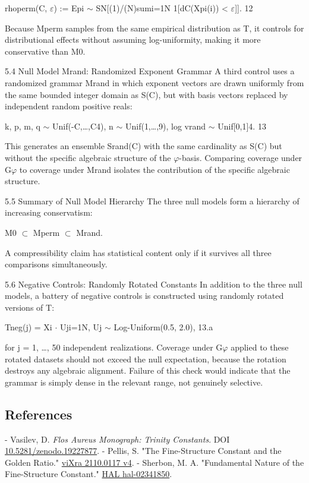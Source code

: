   rhoperm(C, $\varepsilon$) := Epi $\sim$ SN[(1)/(N)sumi=1N 1[dC(Xpi(i)) < $\varepsilon$]]. 12

  Because Mperm samples from the same empirical distribution as T, it controls for
  distributional effects without assuming log-uniformity, making it more conservative
  than M0.

  5.4 Null Model Mrand: Randomized Exponent Grammar
  A third control uses a randomized grammar Mrand in which exponent vectors are
  drawn uniformly from the same bounded integer domain as S(C), but with basis vectors
  replaced by independent random positive reals:

  k, p, m, q $\sim$ Unif({-C,…,C}4), n $\sim$ Unif({1,…,9}), log vrand $\sim$ Unif[0,1]4. 13

  This generates an ensemble Srand(C) with the same cardinality as S(C) but without the
  specific algebraic structure of the $\varphi$-basis. Comparing coverage under G$\varphi$ to coverage
  under Mrand isolates the contribution of the specific algebraic structure.

  5.5 Summary of Null Model Hierarchy
  The three null models form a hierarchy of increasing conservatism:

  M0 $\subset$ Mperm $\subset$ Mrand.

  A compressibility claim has statistical content only if it survives all three comparisons
  simultaneously.

  5.6 Negative Controls: Randomly Rotated Constants
  In addition to the three null models, a battery of negative controls is constructed using
  randomly rotated versions of T:

  Tneg(j) = {Xi $\cdot$ Uj}i=1N, Uj $\sim$ Log-Uniform(0.5, 2.0), 13.a

  for j = 1, …, 50 independent realizations. Coverage under G$\varphi$ applied to these rotated
  datasets should not exceed the null expectation, because the rotation destroys any
  algebraic alignment. Failure of this check would indicate that the grammar is simply
  dense in the relevant range, not genuinely selective.

\subsection{References}

- Vasilev, D. \textit{Flos Aureus Monograph: Trinity Constants}. DOI \href{https://zenodo.org/doi/10.5281/zenodo.19227877}{10.5281/zenodo.19227877}.
- Pellis, S. "The Fine-Structure Constant and the Golden Ratio." \href{https://vixra.org/pdf/2110.0117v4.pdf}{viXra 2110.0117 v4}.
- Sherbon, M. A. "Fundamental Nature of the Fine-Structure Constant." \href{https://hal.science/hal-02341850/document}{HAL hal-02341850}.
